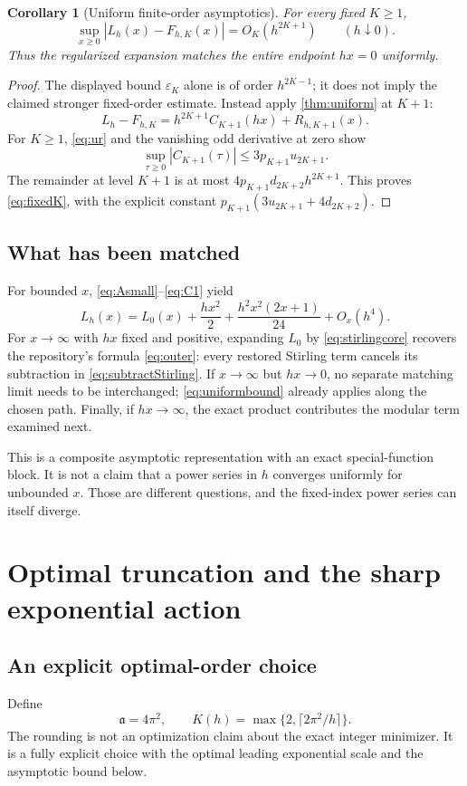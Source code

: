 \documentclass[11pt,a4paper]{article}
\numberwithin{equation}{section}
\newtheorem{corollary}[theorem]{Corollary}
\theoremstyle{definition}
\newcommand{\Act}{\mathfrak a}
\newcommand{\eps}{\varepsilon}
\begin{document}
\begin{corollary}[Uniform finite-order asymptotics]
\label{cor:fixedK}
For every fixed $K\ge1$,
\begin{equation}
\sup_{x\ge0}|L_h(x)-F_{h,K}(x)|=O_K(h^{2K+1})
\qquad(h\downarrow0).
\label{eq:fixedK}
\end{equation}
Thus the regularized expansion matches the entire endpoint $hx=0$ uniformly.
\end{corollary}
\begin{proof}
The displayed bound $\eps_K$ alone is of order $h^{2K-1}$; it does not imply the claimed stronger fixed-order estimate. Instead apply \cref{thm:uniform} at $K+1$:
\[
L_h-F_{h,K}=h^{2K+1}C_{K+1}(hx)+R_{h,K+1}(x).
\]
For $K\ge1$, \eqref{eq:ur} and the vanishing odd derivative at zero show
\[
\sup_{\tau\ge0}|C_{K+1}(\tau)|\le3p_{K+1}u_{2K+1}.
\]
The remainder at level $K+1$ is at most $4p_{K+1}d_{2K+2}h^{2K+1}$. This proves \eqref{eq:fixedK}, with the explicit constant
$p_{K+1}(3u_{2K+1}+4d_{2K+2})$.
\end{proof}

\subsection{What has been matched}
For bounded $x$, \eqref{eq:Asmall}--\eqref{eq:C1} yield
\[
L_h(x)=L_0(x)+\frac{hx^2}{2}
        +\frac{h^2x^2(2x+1)}{24}+O_x(h^4).
\]
For $x\to\infty$ with $hx$ fixed and positive, expanding $L_0$ by \eqref{eq:stirlingcore} recovers the repository's formula \eqref{eq:outer}: every restored Stirling term cancels its subtraction in \eqref{eq:subtractStirling}. If $x\to\infty$ but $hx\to0$, no separate matching limit needs to be interchanged; \eqref{eq:uniformbound} already applies along the chosen path. Finally, if $hx\to\infty$, the exact product contributes the modular term examined next.

This is a composite asymptotic representation with an exact special-function block. It is not a claim that a power series in $h$ converges uniformly for unbounded $x$. Those are different questions, and the fixed-index power series can itself diverge.

\section{Optimal truncation and the sharp exponential action}
\label{sec:optimal}

\subsection{An explicit optimal-order choice}
Define
\begin{equation}
\Act=4\pi^2,\qquad
K(h)=\max\{2,\lceil 2\pi^2/h\rceil\}.
\label{eq:Koptimal}
\end{equation}
The rounding is not an optimization claim about the exact integer minimizer. It is a fully explicit choice with the optimal leading exponential scale and the asymptotic bound below.
\end{document}
